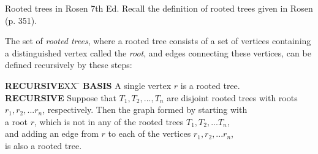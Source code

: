\documentclass[style=sailor,size=12pt]{powerdot}
\begin{document}
\begin{wideslide}[bm=,toc=]{Rooted trees in Rosen 7th Ed.}
  Recall the definition of rooted trees given in Rosen (p. 351).
  
  The set of \emph{rooted trees}, where a rooted tree consists of a set of
  vertices containing a distinguished vertex called the \emph{root}, and
  edges connecting these vertices, can be defined recursively by these steps:
  
  \begin{tabbing}
  {\bf RECURSIVE}XX \=  \kill
  {\bf BASIS} \>
           A single vertex $r$ is a rooted tree.\\[2ex]
  {\bf RECURSIVE} \>
          Suppose that $T_1,T_2,...,T_n$ are disjoint rooted trees with roots\\
  {\bf } \>
          $r_1,r_2,...r_n$, respectively. Then the graph formed by starting with\\
  {\bf } \>
          a root $r$, which is not in any of the rooted trees $T_1,T_2,...T_n$,\\
  {\bf } \>
          and adding an edge from $r$ to each of the vertices $r_1,r_2,...r_n$, \\
  {\bf } \>
          is also a rooted tree.\\[2ex] \\
\end{tabbing}
\end{wideslide}
\end{document}
